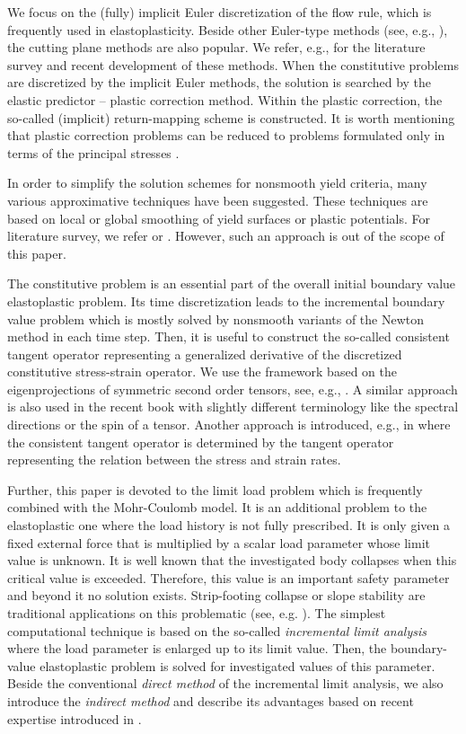 \documentclass[a4paper,12pt]{article}
\theoremstyle{remark}
\numberwithin{equation}{section}
\begin{document}
We focus on the (fully) implicit Euler discretization of the flow rule, which is frequently used in elastoplasticity. Beside other Euler-type methods (see, e.g., \cite{NPO08, SH98}), the cutting plane methods are also popular. We refer, e.g., \cite{SHVS14} for the literature survey and recent development of these methods. When the constitutive problems are discretized by the implicit Euler methods, the solution is searched by the elastic predictor -- plastic correction method. Within the plastic correction, the so-called (implicit) return-mapping scheme is constructed. It is worth mentioning that plastic correction problems can be reduced to problems formulated only in terms of the principal stresses \cite{CDA06, CDA15, NPO08}.

In order to simplify the solution schemes for nonsmooth yield criteria, many various approximative techniques have been suggested. These techniques are based on local or global smoothing of yield surfaces or plastic potentials. For literature survey, we refer \cite[Section 1.2]{CDA15} or \cite{ALSH11, B13, BSS03}. However, such an approach is out of the scope of this paper.

The constitutive problem is an essential part of the overall initial boundary value elastoplastic problem. Its time discretization leads to the incremental boundary value problem which is mostly solved by nonsmooth variants of the Newton method \cite{CKSV14, GrVa09, SaWi11, Sy09, Sy14} in each time step. Then, it is useful to construct the so-called consistent tangent operator representing a generalized derivative of the discretized constitutive stress-strain operator. We use the framework based on the eigenprojections of symmetric second order tensors, see, e.g., \cite{CaHo86, NPO08}. A similar approach is also used in the recent book \cite{B13} with slightly different terminology like the spectral directions or the spin of a tensor. Another approach is introduced, e.g., in \cite{C97, CDA06, CDA15} where the consistent tangent operator is determined by the tangent operator representing the relation between the stress and strain rates.

Further, this paper is devoted to the limit load problem which is frequently combined with the Mohr-Coulomb model. It is an additional problem to the elastoplastic one where the load history is not fully prescribed. It is only given a fixed external force that is multiplied by a scalar load parameter whose limit value is unknown. It is well known that the investigated body collapses when this critical value is exceeded. Therefore, this value is an important safety parameter and beyond it no solution exists. Strip-footing collapse or slope stability are traditional applications on this problematic (see, e.g. \cite{CL90, NPO08}).  The simplest computational technique is based on the so-called {\it incremental limit analysis} where the load parameter is enlarged up to its limit value. Then, the boundary-value elastoplastic problem is solved for investigated values of this parameter. Beside the conventional {\it direct method} of the incremental limit analysis, we also introduce the {\it indirect method} and describe its advantages based on recent expertise introduced in \cite{SHHC15, CHKS15, HRS16, HRS16b}.
\end{document}
